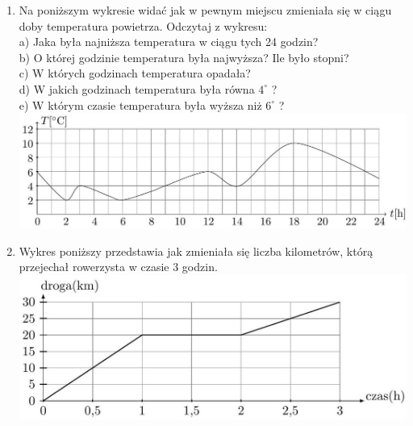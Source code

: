 \documentclass[10pt]{article}
\begin{document}
\begin{enumerate}
  \item Na poniższym wykresie widać jak w pewnym miejscu zmieniała się w ciągu doby temperatura powietrza. Odczytaj z wykresu:\\
a) Jaka była najniższa temperatura w ciągu tych 24 godzin?\\
b) O której godzinie temperatura była najwyższa? Ile było stopni?\\
c) W których godzinach temperatura opadała?\\
d) W jakich godzinach temperatura była równa \(4^{\circ}\) ?\\
e) W którym czasie temperatura była wyższa niż \(6^{\circ}\) ?\\
\includegraphics[max width=\textwidth, center]{2024_11_21_e9b4faa005d5be2cc318g-117}
  \item Wykres poniższy przedstawia jak zmieniała się liczba kilometrów, którą przejechał rowerzysta w czasie 3 godzin.\\
\includegraphics[max width=\textwidth, center]{2024_11_21_e9b4faa005d5be2cc318g-117(1)}
\end{enumerate}
\end{document}
